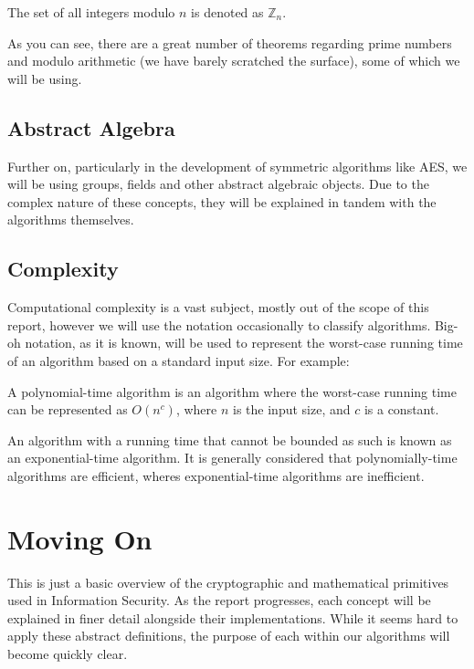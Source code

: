 \begin{mathdef}
	The set of all integers modulo $n$ is denoted as $\mathbb{Z}_n$.
\end{mathdef}

As you can see, there are a great number of theorems regarding prime numbers and modulo arithmetic (we have barely scratched the surface), some of which we will be using.

\subsection{Abstract Algebra}

Further on, particularly in the development of symmetric algorithms like AES, we will be using groups, fields and other abstract algebraic objects. Due to the complex nature of these concepts, they will be explained in tandem with the algorithms themselves.

\subsection{Complexity}

Computational complexity is a vast subject, mostly out of the scope of this report, however we will use the notation occasionally to classify algorithms. Big-oh notation, as it is known, will be used to represent the worst-case running time of an algorithm based on a standard input size. For example:

\begin{mathdef}
	A polynomial-time algorithm is an algorithm where the worst-case running time can be represented as $O(n^c)$, where $n$ is the input size, and $c$ is a constant. 
\end{mathdef}

An algorithm with a running time that cannot be bounded as such is known as an exponential-time algorithm. It is generally considered that polynomially-time algorithms are efficient, wheres exponential-time algorithms are inefficient.

\section{Moving On}

This is just a basic overview of the cryptographic and mathematical primitives used in Information Security. As the report progresses, each concept will be explained in finer detail alongside their implementations. While it seems hard to apply these abstract definitions, the purpose of each within our algorithms will become quickly clear.